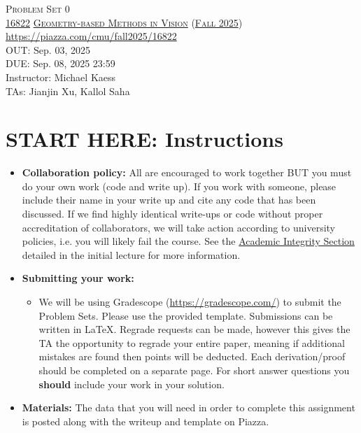 \documentclass[11pt,addpoints,answers]{exam}
\title{\textsc{\hwName}} %
\author{}
\date{}
\date{}
\numberwithin{equation}{section} %
\numberwithin{figure}{section} %
\numberwithin{table}{section} %
\newcommand{\courseNum}{\href{https://geometric3d.github.io}{16822}}
\newcommand{\courseName}{\href{https://geometric3d.github.io}{Geometry-based Methods in Vision}}
\newcommand{\courseSem}{\href{https://geometric3d.github.io}{Fall 2025}}
\newcommand{\courseUrl}{\url{https://piazza.com/cmu/fall2025/16822}}
\newcommand{\hwNum}{Problem Set 0}
\newcommand{\hwTopic}{Linear Algebra }
\newcommand{\outDate}{Sep. 03, 2025}
\newcommand{\dueDate}{Sep. 08, 2025 23:59}
\newcommand{\instructorName}{Michael Kaess}
\newcommand{\taNames}{Jianjin Xu, Kallol Saha}
\begin{document}
\section*{}
\begin{center}
  \textsc{\LARGE \hwNum} \\
  \vspace{1em}
  \textsc{\large \courseNum{} \courseName{} (\courseSem)} \\
  \courseUrl\\
  \vspace{1em}
  OUT: \outDate \\
  DUE: \dueDate \\
  Instructor: \instructorName \\
  TAs: \taNames
\end{center}

\section*{START HERE: Instructions}
\begin{itemize}
\item \textbf{Collaboration policy:} All are encouraged to work together BUT you must do your own work (code and write up). If you work with someone, please include their name in your write up and cite any code that has been discussed. If we find highly identical write-ups or code without proper accreditation of collaborators, we will take action according to university policies, i.e. you will likely fail the course. See the \href{https://www.dropbox.com/s/z6o0tinc9eaez46/L01_Overview.pdf?dl=0}{Academic Integrity Section} detailed in the initial lecture for more information.


\item\textbf{Submitting your work:}

\begin{itemize}

\item We will be using Gradescope (\url{https://gradescope.com/}) to submit the Problem Sets. Please use the provided template. Submissions can be written in LaTeX. Regrade requests can be made, however this gives the TA the opportunity to regrade your entire paper, meaning if additional mistakes are found then points will be deducted.
Each derivation/proof should be  completed on a separate page. For short answer questions you \textbf{should} include your work in your solution.  
\end{itemize}

\item \textbf{Materials:} The data that you will need in order to complete this assignment is posted along with the writeup and template on Piazza.

\end{itemize}
\end{document}
